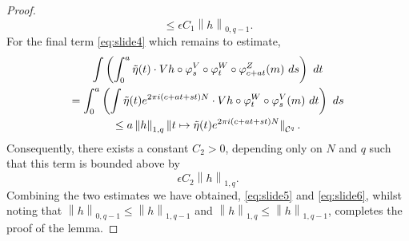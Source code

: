 \documentclass[10pt,a4paper]{amsart}
\newcommand{\cC}{\mathcal{C}} %
\newcommand{\dv}{V} %
\newcommand{\dw}{W} %
\newcommand{\dz}{Z} %
\newcommand{\norm}[1]{\left\|#1\right\|} %
\begin{document}
\begin{proof}
\begin{equation}
        \leq \epsilon C_1 \norm{h}_{0,q-1}.
    \end{equation}
    For the final term  \eqref{eq:slide4} which remains to estimate, 
    \begin{multline*}
        \int \left( \int_{0}^{a} \tilde{\eta}(t) \cdot \dv h \circ \varphi_{s}^{\dv} \circ \varphi_{t}^{\dw} \circ \varphi_{c+at}^\dz (m) \ ds \right) \ dt \\
        = \int_{0}^{a} \left( \int \tilde{\eta}(t) e^{2\pi i (c + at + st)N} \cdot \dv h  \circ \varphi_{t}^{\dw} \circ \varphi_{s}^{\dv} (m) \ dt \right) \ ds \\
        \leq a \norm{h}_{1,{q}} \norm{\smash{t \mapsto  \tilde{\eta}(t) e^{2\pi i (c + at + st)N} }}_{\cC^{q}}.
    \end{multline*}
    Consequently, there exists a constant \(C_2>0\), depending only on \(N\) and \(q\) such that this term is bounded above by
    \begin{equation}
        \label{eq:slide6}
        \epsilon C_2 \norm{h}_{1,q}.
    \end{equation}
    Combining the two estimates we have obtained, \eqref{eq:slide5} and \eqref{eq:slide6}, whilst noting that \(\norm{h}_{0,q-1} \leq \norm{h}_{1,q-1}\) and \(\norm{h}_{1,q} \leq \norm{h}_{1,q-1}\), completes the proof of the lemma.
\end{proof}
\end{document}
